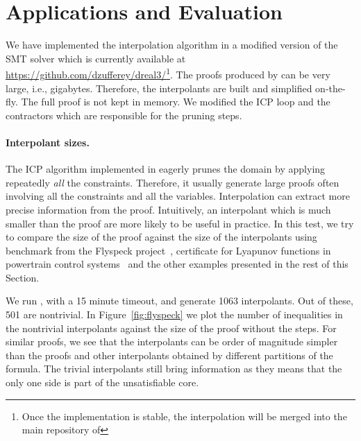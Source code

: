 \section{Applications and Evaluation}
\label{sec:eval}

We have implemented the interpolation algorithm in a modified version of the \dReal SMT solver which is currently available at \url{https://github.com/dzufferey/dreal3/}\footnote{Once the implementation is stable, the interpolation will be merged into the main repository of \dReal}.
The proofs produced by \dReal can be very large, i.e., gigabytes.
Therefore, the interpolants are built and simplified on-the-fly.
The full proof is not kept in memory.
We modified the ICP loop and the contractors which are responsible for the pruning steps.

\paragraph{Interpolant sizes.}
The ICP algorithm implemented in \dReal eagerly prunes the domain by applying repeatedly \emph{all} the constraints.
Therefore, it usually generate large proofs often involving all the constraints and all the variables.
Interpolation can extract more precise information from the proof.
Intuitively, an interpolant which is much smaller than the proof are more likely to be useful in practice.
In this test, we try to compare the size of the proof against the size of the interpolants using benchmark from the Flyspeck project~\cite{2015arXiv150102155H}, certificate for Lyapunov functions in powertrain control systems~\cite{DBLP:conf/hybrid/KapinskiDSA14} and the other examples presented in the rest of this Section.


We run \dReal, with a 15 minute timeout, and generate 1063 interpolants.
Out of these, 501 are nontrivial.
In Figure~\ref{fig:flyspeck} we plot the number of inequalities in the nontrivial interpolants against the size of the proof without the \weaken steps.
For similar proofs, we see that the interpolants can be order of magnitude simpler than the proofs and other interpolants obtained by different partitions of the formula.
The trivial interpolants still bring information as they means that the only one side is part of the unsatisfiable core.


